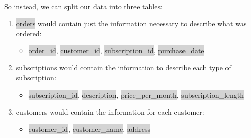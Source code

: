 \documentclass[11pt]{article}
\begin{document}
{{So instead, we can split our data into three tables:
\begin{enumerate}[leftmargin = *]
\item \colorbox{lightgray}{orders} would contain just the information necessary to describe what was ordered:
\begin{itemize}
\item \colorbox{lightgray}{order\_id}, \colorbox{lightgray}{customer\_id}, \colorbox{lightgray}{subscription\_id}, \colorbox{lightgray}{purchase\_date}
\end{itemize}
\item subscriptions would contain the information to describe each type of subscription:
\begin{itemize}
\item \colorbox{lightgray}{subscription\_id}, \colorbox{lightgray}{description}, \colorbox{lightgray}{price\_per\_month}, \colorbox{lightgray}{subscription\_length}
\end{itemize}
\item customers would contain the information for each customer:
\begin{itemize}
\item \colorbox{lightgray}{customer\_id}, \colorbox{lightgray}{customer\_name}, \colorbox{lightgray}{address}
\end{itemize}
\end{enumerate}

}}
\end{document}
